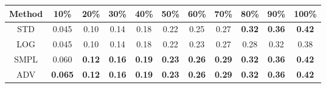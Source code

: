 \documentclass{standalone}
\begin{document}
\begin{tabular}{c|cccccccccc}
      \toprule
      Method & 10\% & 20\% & 30\% & 40\% & 50\% & 60\% & 70\% & 80\% & 90\% & 100\% \\
      \midrule
STD & 0.045 & 0.10 & 0.14 & 0.18 & 0.22 & 0.25 & 0.27 & \textbf{0.32} & \textbf{0.36} & \textbf{0.42}\\
LOG & 0.045 & 0.10 & 0.14 & 0.18 & 0.22 & 0.23 & 0.27 & 0.28 & 0.32 & 0.38\\
SMPL & 0.060 & \textbf{0.12} & \textbf{0.16} & \textbf{0.19} & \textbf{0.23} & \textbf{0.26} & \textbf{0.29} & \textbf{0.32} & \textbf{0.36} & \textbf{0.42}\\
ADV & \textbf{0.065} & \textbf{0.12} & \textbf{0.16} & \textbf{0.19} & \textbf{0.23} & \textbf{0.26} & \textbf{0.29} & \textbf{0.32} & \textbf{0.36} & \textbf{0.42}\\
  \bottomrule
\end{tabular}
\end{document}
